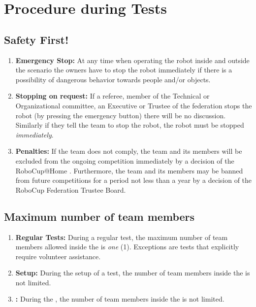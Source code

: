 \section{Procedure during Tests}

\subsection{Safety First!}
\label{rule:safetyfirst}
\begin{enumerate}
	\item \textbf{Emergency Stop:} At any time when operating the robot inside and outside the scenario the owners have to stop the robot immediately if there is a possibility of dangerous behavior towards people and/or objects.
	\item \textbf{Stopping on request:} If a referee, member of the Technical or Organizational committee, an Executive or Trustee of the federation stops the robot (by pressing the emergency button) there will be no discussion. Similarly if they tell the team to stop the robot, the robot must be stopped \emph{immediately}.
	\item \textbf{Penalties:} If the team does not comply, the team and its members will be excluded from the ongoing competition immediately by a decision of the RoboCup@Home . 	Furthermore, the team and its members may be banned from future competitions for a period not less than a year by a decision of the RoboCup Federation Trustee Board.
\end{enumerate}

\subsection{Maximum number of team members}
\label{rule:number_of_people}
\begin{enumerate}
	\item \textbf{Regular Tests:} During a regular test, the maximum number of team members allowed inside the \Arena{} is \emph{one} (1).
	Exceptions are tests that explicitly require volunteer assistance.
	\item \textbf{Setup:} During the setup of a test, the number of team members inside the \Arena{} is not limited.
	\item \textbf{\FINAL:} During the \FINAL, the number of team members inside the \Arena{} is not limited.
\end{enumerate}

